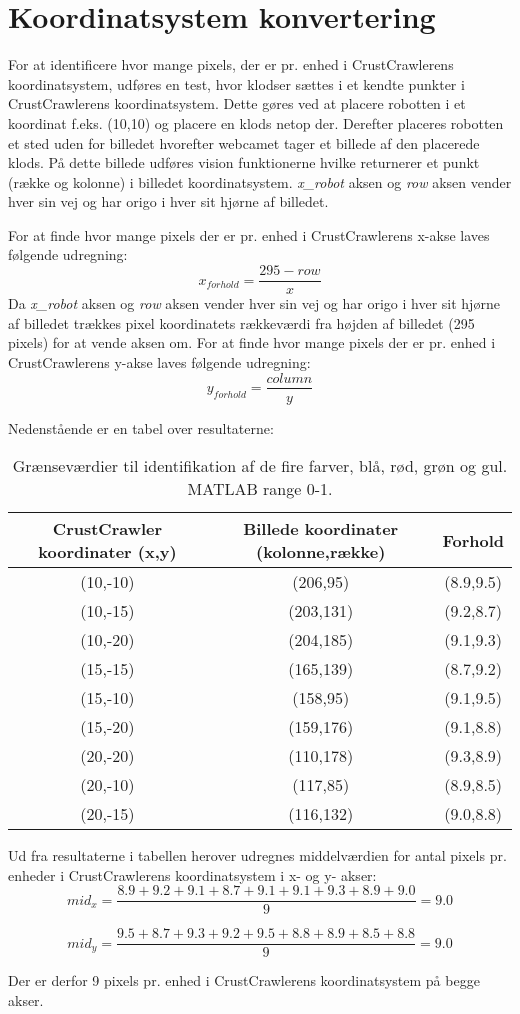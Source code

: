 \chapter{Koordinatsystem konvertering}\label{app:KoordinatsystemKonvertering}
For at identificere hvor mange pixels, der er pr. enhed i CrustCrawlerens koordinatsystem, udføres en test, hvor klodser sættes i et kendte punkter i CrustCrawlerens koordinatsystem.
Dette gøres ved at placere robotten i et koordinat f.eks. (10,10) og placere en klods netop der.
Derefter placeres robotten et sted uden for billedet hvorefter webcamet tager et billede af den placerede klods.
På dette billede udføres vision funktionerne  hvilke returnerer et punkt (række og kolonne) i billedet koordinatsystem.
\textit{x\_robot} aksen og \textit{row} aksen vender hver sin vej og har origo i hver sit hjørne af billedet.

For at finde hvor mange pixels der er pr. enhed i CrustCrawlerens x-akse laves følgende udregning:
\begin{equation}
	x_{forhold}=\frac{295-row}{x}
\end{equation}
Da \textit{x\_robot} aksen og \textit{row} aksen vender hver sin vej og har origo i hver sit hjørne af billedet trækkes pixel koordinatets rækkeværdi fra højden af billedet (295 pixels) for at vende aksen om.
For at finde hvor mange pixels der er pr. enhed i CrustCrawlerens y-akse laves følgende udregning:
\begin{equation}
	y_{forhold}=\frac{column}{y}
\end{equation}

Nedenstående er en tabel over resultaterne:
\begin{table}[H]
\centering
\begin{tabular}{c|c|c}
CrustCrawler koordinater (x,y)	&	Billede koordinater (kolonne,række)	& Forhold\\
\hline
(10,-10)	&	(206,95)		&	(8.9,9.5)\\
(10,-15)	&	(203,131)	&	(9.2,8.7)\\
(10,-20)	&	(204,185)	&	(9.1,9.3)\\
(15,-15)	&	(165,139)	&	(8.7,9.2)\\
(15,-10)	&	(158,95)		&	(9.1,9.5)\\
(15,-20)	&	(159,176)	&	(9.1,8.8)\\
(20,-20)	&	(110,178)	&	(9.3,8.9)\\
(20,-10)	&	(117,85)		&	(8.9,8.5)\\
(20,-15)	&	(116,132)	&	(9.0,8.8)\\
\end{tabular}	
\caption{Grænseværdier til identifikation af de fire farver, blå, rød, grøn og gul. MATLAB range 0-1.}
\end{table}
\newpage
Ud fra resultaterne i tabellen herover udregnes middelværdien for antal pixels pr. enheder i CrustCrawlerens koordinatsystem i x- og y- akser:
\begin{equation}
	mid_x=\frac{8.9+9.2+9.1+8.7+9.1+9.1+9.3+8.9+9.0}{9}=9.0
\end{equation}

\begin{equation}
	mid_y=\frac{9.5+8.7+9.3+9.2+9.5+8.8+8.9+8.5+8.8}{9}=9.0
\end{equation}

Der er derfor 9 pixels pr. enhed i CrustCrawlerens koordinatsystem på begge akser.